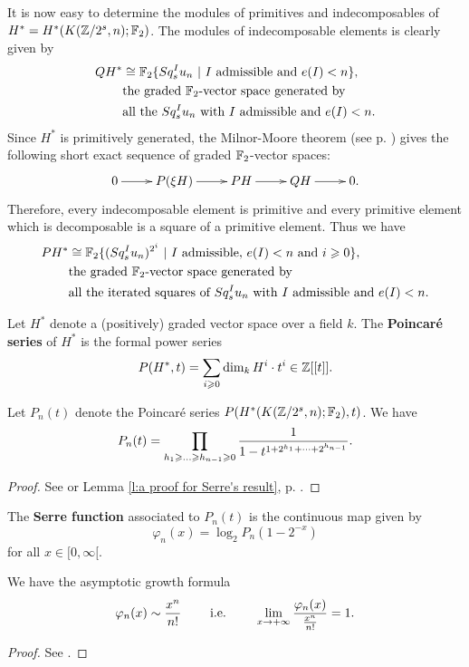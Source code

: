 It is now easy to determine the modules of primitives and indecomposables of $H^*=H^*(K(\mathbb{Z}/2^s,n);\mathbb{F}_2)$. The modules of indecomposable elements is clearly given by
\begin{align*}
QH^*&\cong\mathbb{F}_2\{Sq^I_s u_n\ |\ \text{$I$ admissible and $e(I)<n$}\},\\
&\text{the graded $\mathbb{F}_2$-vector space generated by}\\
&\text{all the $Sq^I_s u_n$ with $I$ admissible and $e(I)<n$.}\\
\end{align*}
Since $H^*$ is primitively generated, the Milnor-Moore theorem (see p. \pageref{t:Milnor-Moore}) gives the following short exact sequence of graded $\mathbb{F}_2$-vector spaces:
$$\xymatrix{
0\ar[r] &P(\xi H)\ar[r] &PH\ar[r] &QH\ar[r] &0.
}$$ Therefore, every indecomposable element is primitive and every primitive element which is decomposable is a square of a primitive element. Thus we have
\begin{align*}
PH^*&\cong\mathbb{F}_2\{(Sq^I_s u_n)^{2^i}\ |\ \text{$I$ admissible, $e(I)<n$ and $i\geqslant0$}\},\\
&\text{the graded $\mathbb{F}_2$-vector space generated by}\\
&\text{all the iterated squares of $Sq^I_s u_n$ with $I$ admissible and $e(I)<n$.}\\
\end{align*}


\begin{defn}
Let $H^*$ denote a (positively) graded vector space over a field $k$. The {\bf Poincar\'e series} of $H^*$ is the formal power series $$P(H^*,t)=\sum_{i\geqslant0}\dim_k H^i\cdot t^i\in\mathbb{Z}[[t]].$$
\end{defn}

\begin{prop}\label{p:Poincare serie for K(Z/2,n)}
Let $P_n(t)$ denote the Poincar\'e series $P(H^*(K(\mathbb{Z}/2^s,n);\mathbb{F}_2),t)$. We have
$$
P_n(t)=\prod_{h_1\geq\dots\geq h_{n-1}\geq0}{1\over1-t^{1+2^{h_1}+\dots+2^{h_{n-1}}}}.
$$
\end{prop}

\begin{proof}
See \cite[Th\'eor\`eme 1 and formula (17.7), pp. 211-212]{Se53} or Lemma \ref{l:a proof for Serre's result}, p. \pageref{l:a proof for Serre's result}.
\end{proof}

\begin{defn}
The {\bf Serre function} associated to $P_n(t)$ is the continuous map given by
$$
\varphi_n(x)=\log_2 P_n(1-2^{-x})
$$ for all $x\in[0,\infty[$.
\end{defn}

\begin{thm}\label{t:2.3-Serre}
We have the asymptotic growth formula
$$
\varphi_n(x)\sim {x^n\over n!}\hskip0.8truecm\text{i.e.}\hskip0.8truecm
\lim_{x\to+\infty}{\varphi_n(x)\over {x^n\over n!}}=1.
$$
\end{thm}

\begin{proof}
See \cite[Th\'eor\`eme 6, pp. 215-216]{Se53}.
\end{proof}